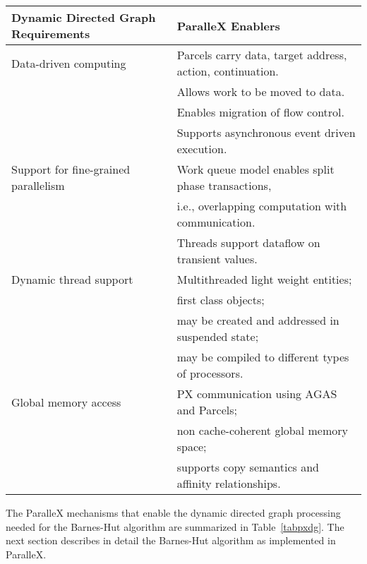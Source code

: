 \documentclass[floatfix]{revtex4}
\begin{document}
\begin{center}
\begin{table*}[htbp]
   \centering
\caption{Overview of ParalleX mechanisms that enable dynamic directed graph processing. }
   \label{tabpxdg}
   \begin{tabular}{|l|l|} 
\hline
      \toprule
      \textbf{Dynamic Directed Graph Requirements }  & \textbf{ParalleX Enablers} \\
      \midrule
\hline
      Data-driven computing & Parcels carry data, target address, action, continuation.\\
                            & Allows work to be moved to data.\\
                            & Enables migration of flow control.\\
                            & Supports asynchronous event driven execution.\\
\hline
      Support for fine-grained parallelism & Work queue model enables split phase transactions, \\
                                           & i.e., overlapping computation with communication. \\
                                           & Threads support dataflow on transient values. \\
\hline
      Dynamic thread support & Multithreaded light weight entities; \\
                             & first class objects;  \\
                             & may be created and addressed in suspended state; \\
                             & may be compiled to different types of processors. \\
\hline
     Global memory access & PX communication using AGAS and Parcels; \\
                          & non cache-coherent global memory space; \\
                          & supports copy semantics and affinity relationships.\\
\hline
      \bottomrule
   \end{tabular}

\end{table*}
\end{center}


The ParalleX mechanisms that enable the dynamic directed graph processing needed for
the Barnes-Hut algorithm are summarized in Table~\ref{tabpxdg}. The next section describes
in detail the Barnes-Hut algorithm as implemented in ParalleX.
\end{document}
